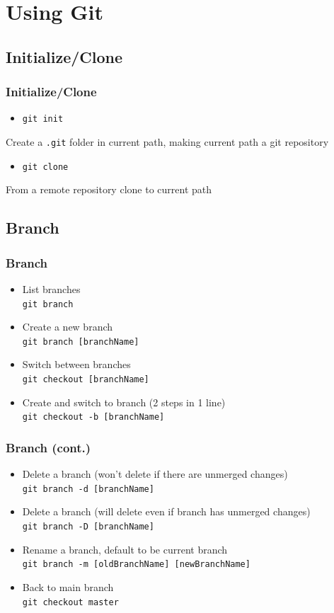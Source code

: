 \documentclass{beamer}
\begin{document}
	\section{Using Git}
		\subsection{Initialize/Clone}
			\begin{frame}
				\frametitle{Initialize/Clone}
				\begin{itemize}
					\item \texttt{git init}
				\end{itemize}
				Create a \texttt{.git} folder in current path, making current path a git repository

				\begin{itemize}
					\item \texttt{git clone}
				\end{itemize}
				From a remote repository clone to current path
			\end{frame}

		\subsection{Branch}
			\begin{frame}
				\frametitle{Branch}
				\begin{itemize}
					\item List branches\\
						\texttt{git branch}
					\item Create a new branch\\
						\texttt{git branch [branchName]}
					\item Switch between branches\\
						\texttt{git checkout [branchName]}
					\item Create and switch to branch (2 steps in 1 line)\\
						\texttt{git checkout -b [branchName]}
				\end{itemize}
			\end{frame}

			\begin{frame}
				\frametitle{Branch (cont.)}
				\begin{itemize}						
					\item Delete a branch (won't delete if there are unmerged changes)\\
						\texttt{git branch -d [branchName]}
					\item Delete a branch (will delete even if branch has unmerged changes)\\
						\texttt{git branch -D [branchName]}
					\item Rename a branch, default to be current branch\\
						\texttt{git branch -m [oldBranchName] [newBranchName]}
					\item Back to main branch\\
						\texttt{git checkout master}
				\end{itemize}
			\end{frame}
\end{document}

